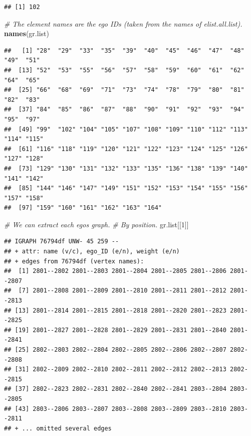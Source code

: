 \documentclass[
]{book}
\newenvironment{Shaded}{\begin{snugshade}}{\end{snugshade}}
\newcommand{\CommentTok}[1]{\textcolor[rgb]{0.56,0.35,0.01}{\textit{#1}}}
\newcommand{\DecValTok}[1]{\textcolor[rgb]{0.00,0.00,0.81}{#1}}
\newcommand{\FunctionTok}[1]{\textcolor[rgb]{0.13,0.29,0.53}{\textbf{#1}}}
\newcommand{\NormalTok}[1]{#1}
\begin{document}
\begin{verbatim}
## [1] 102
\end{verbatim}

\begin{Shaded}
\begin{Highlighting}[]
\CommentTok{\# The element names are the ego IDs (taken from the names of elist.all.list).}
\FunctionTok{names}\NormalTok{(gr.list)}
\end{Highlighting}
\end{Shaded}

\begin{verbatim}
##   [1] "28"  "29"  "33"  "35"  "39"  "40"  "45"  "46"  "47"  "48"  "49"  "51" 
##  [13] "52"  "53"  "55"  "56"  "57"  "58"  "59"  "60"  "61"  "62"  "64"  "65" 
##  [25] "66"  "68"  "69"  "71"  "73"  "74"  "78"  "79"  "80"  "81"  "82"  "83" 
##  [37] "84"  "85"  "86"  "87"  "88"  "90"  "91"  "92"  "93"  "94"  "95"  "97" 
##  [49] "99"  "102" "104" "105" "107" "108" "109" "110" "112" "113" "114" "115"
##  [61] "116" "118" "119" "120" "121" "122" "123" "124" "125" "126" "127" "128"
##  [73] "129" "130" "131" "132" "133" "135" "136" "138" "139" "140" "141" "142"
##  [85] "144" "146" "147" "149" "151" "152" "153" "154" "155" "156" "157" "158"
##  [97] "159" "160" "161" "162" "163" "164"
\end{verbatim}

\begin{Shaded}
\begin{Highlighting}[]
\CommentTok{\# We can extract each ego\textquotesingle{}s graph.}
\CommentTok{\# By position.}
\NormalTok{gr.list[[}\DecValTok{1}\NormalTok{]]}
\end{Highlighting}
\end{Shaded}

\begin{verbatim}
## IGRAPH 76794df UNW- 45 259 -- 
## + attr: name (v/c), ego_ID (e/n), weight (e/n)
## + edges from 76794df (vertex names):
##  [1] 2801--2802 2801--2803 2801--2804 2801--2805 2801--2806 2801--2807
##  [7] 2801--2808 2801--2809 2801--2810 2801--2811 2801--2812 2801--2813
## [13] 2801--2814 2801--2815 2801--2818 2801--2820 2801--2823 2801--2825
## [19] 2801--2827 2801--2828 2801--2829 2801--2831 2801--2840 2801--2841
## [25] 2802--2803 2802--2804 2802--2805 2802--2806 2802--2807 2802--2808
## [31] 2802--2809 2802--2810 2802--2811 2802--2812 2802--2813 2802--2815
## [37] 2802--2823 2802--2831 2802--2840 2802--2841 2803--2804 2803--2805
## [43] 2803--2806 2803--2807 2803--2808 2803--2809 2803--2810 2803--2811
## + ... omitted several edges
\end{verbatim}
\end{document}
